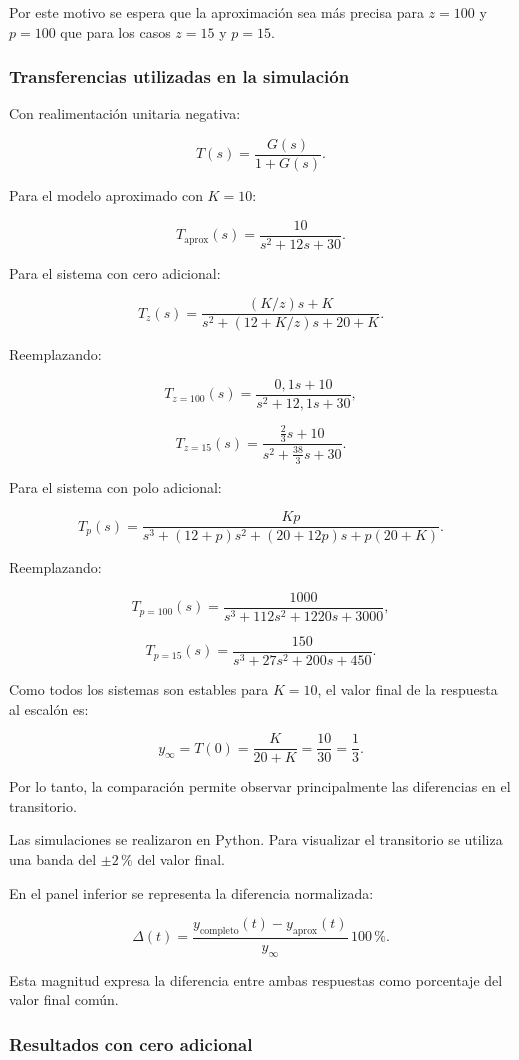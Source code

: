 \documentclass[12pt,a4paper]{article}
\begin{document}
Por este motivo se espera que la aproximación sea más
precisa para $z=100$ y $p=100$ que para los casos
$z=15$ y $p=15$.


\subsubsection*{Transferencias utilizadas en la simulación}

Con realimentación unitaria negativa:

\[
T(s)
=
\frac{G(s)}
{1+G(s)}.
\]

Para el modelo aproximado con $K=10$:

\[
\boxed{
T_{\mathrm{aprox}}(s)
=
\frac{10}
{s^2+12s+30}.
}
\]

Para el sistema con cero adicional:

\[
T_z(s)
=
\frac{(K/z)s+K}
{s^2+(12+K/z)s+20+K}.
\]

Reemplazando:

\[
T_{z=100}(s)
=
\frac{0{,}1s+10}
{s^2+12{,}1s+30},
\]

\[
T_{z=15}(s)
=
\frac{
\frac{2}{3}s+10
}{
s^2+\frac{38}{3}s+30
}.
\]

Para el sistema con polo adicional:

\[
T_p(s)
=
\frac{Kp}
{
s^3+(12+p)s^2+(20+12p)s+p(20+K)
}.
\]

Reemplazando:

\[
T_{p=100}(s)
=
\frac{1000}
{s^3+112s^2+1220s+3000},
\]

\[
T_{p=15}(s)
=
\frac{150}
{s^3+27s^2+200s+450}.
\]

Como todos los sistemas son estables para $K=10$,
el valor final de la respuesta al escalón es:

\[
\boxed{
y_\infty
=
T(0)
=
\frac{K}{20+K}
=
\frac{10}{30}
=
\frac{1}{3}.
}
\]

Por lo tanto, la comparación permite observar principalmente
las diferencias en el transitorio.

Las simulaciones se realizaron en Python. Para visualizar
el transitorio se utiliza una banda del $\pm2\,\%$ del
valor final.

En el panel inferior se representa la diferencia normalizada:

\[
\Delta(t)
=
\frac{
y_{\mathrm{completo}}(t)
-
y_{\mathrm{aprox}}(t)
}{
y_\infty
}
\,100\,\%.
\]

Esta magnitud expresa la diferencia entre ambas respuestas
como porcentaje del valor final común.


\subsubsection*{Resultados con cero adicional}
\end{document}
